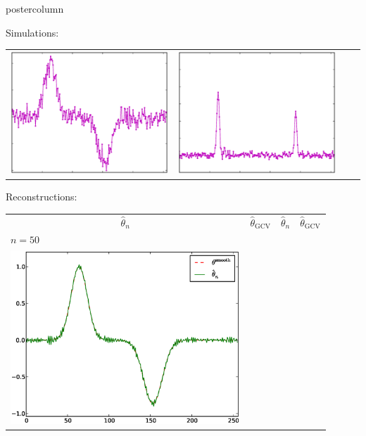 \documentclass[final]{beamer}
\begin{document}
\begin{frame}
\begin{columns}
\begin{column}{.32\textwidth}
\begin{beamercolorbox}[center,wd=\textwidth]{postercolumn}
\begin{minipage}[T]{.95\textwidth}
{\begin{block}{Simulations:}
\begin{table}
\begin{tabular}{cccc}
                  \includegraphics[width=3.4in,trim=0 30 0 0,clip]{./figures/thetasmoothDataPlot0.eps} &
                  \includegraphics[width=3.4in,trim=0 30 0 0,clip]{./figures/thetapeakedDataPlot2.eps} \\
                \end{tabular}
              \end{table}
            \end{block}
            \begin{block}{Reconstructions:}
              \begin{table}
                \centering
                \begin{tabular}{cccc}
                  $\hat\theta_n$ & $\hat \theta_{\text{GCV}}$ & $\hat\theta_n$ & $\hat \theta_{\text{GCV}}$ \\
                  \multicolumn{4}{l}{$n = 50$}  \\
                  \includegraphics[width=3.4in,trim=0 30 0 0,clip]{./figures/minesmooth200.eps} &

\end{tabular}
\end{table}
\end{block}}
\end{minipage}
\end{beamercolorbox}
\end{column}
\end{columns}
\end{frame}
\end{document}
